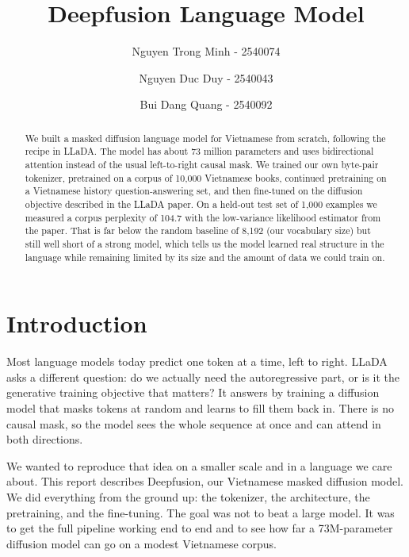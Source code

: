 \documentclass{llncs}
\begin{document}
%
\title{Deepfusion Language Model}

\author{Nguyen Trong Minh - 2540074\and
Nguyen Duc Duy - 2540043 \and Bui Dang Quang - 2540092}

\maketitle

\begin{abstract}
We built a masked diffusion language model for Vietnamese from scratch, following
the recipe in LLaDA. The model has about 73 million parameters and uses bidirectional
attention instead of the usual left-to-right causal mask. We trained our own byte-pair
tokenizer, pretrained on a corpus of 10{,}000 Vietnamese books, continued pretraining on
a Vietnamese history question-answering set, and then fine-tuned on the diffusion objective
described in the LLaDA paper. On a held-out test set of 1{,}000 examples we measured a
corpus perplexity of 104.7 with the low-variance likelihood estimator from the paper. That is
far below the random baseline of 8{,}192 (our vocabulary size) but still well short of a strong
model, which tells us the model learned real structure in the language while remaining limited
by its size and the amount of data we could train on.

\end{abstract}

\section{Introduction}

Most language models today predict one token at a time, left to right. LLaDA \cite{llada}
asks a different question: do we actually need the autoregressive part, or is it the
generative training objective that matters? It answers by training a diffusion model that
masks tokens at random and learns to fill them back in. There is no causal mask, so the
model sees the whole sequence at once and can attend in both directions.

We wanted to reproduce that idea on a smaller scale and in a language we care about. This
report describes Deepfusion, our Vietnamese masked diffusion model. We did everything from
the ground up: the tokenizer, the architecture, the pretraining, and the fine-tuning. The
goal was not to beat a large model. It was to get the full pipeline working end to end and
to see how far a 73M-parameter diffusion model can go on a modest Vietnamese corpus.
\end{document}
